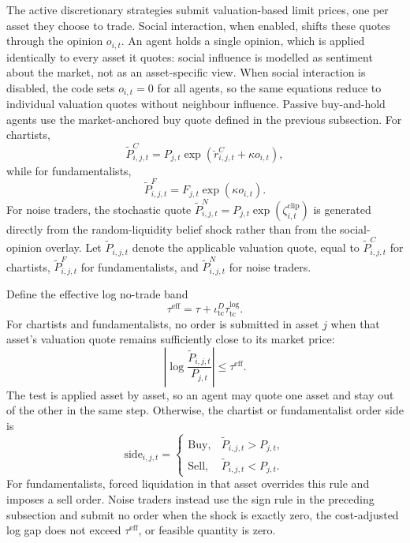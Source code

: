 \documentclass[12pt, a4paper]{article}
\begin{document}
    The active discretionary strategies submit valuation-based limit prices, one
    per asset they choose to trade. Social interaction, when enabled, shifts these
    quotes through the opinion \(o_{i,t}\). An agent holds a single opinion, which
    is applied identically to every asset it quotes: social influence is modelled
    as sentiment about the market, not as an asset-specific view. When social
    interaction is disabled, the code sets \(o_{i,t}=0\) for all agents, so the
    same equations reduce to individual valuation quotes without neighbour
    influence. Passive buy-and-hold agents use the market-anchored buy quote
    defined in the previous subsection. For chartists,
    \begin{equation}
        \tilde P_{i,j,t}^{C}=P_{j,t}\exp\!\left(\breve r_{i,j,t}^{C}+\kappa o_{i,t}\right),
    \end{equation}
    while for fundamentalists,
    \begin{equation}
        \tilde P_{i,j,t}^{F}=F_{j,t}\exp\!\left(\kappa o_{i,t}\right).
    \end{equation}
    For noise traders, the stochastic quote
    \(\tilde P_{i,j,t}^{N}=P_{j,t}\exp(\zeta_{i,t}^{\mathrm{clip}})\) is generated
    directly from the random-liquidity belief shock rather than from the
    social-opinion overlay.
    Let \(\tilde P_{i,j,t}\) denote the applicable valuation quote, equal to
    \(\tilde P_{i,j,t}^{C}\) for chartists, \(\tilde P_{i,j,t}^{F}\) for
    fundamentalists, and \(\tilde P_{i,j,t}^{N}\) for noise traders.

    Define the effective log no-trade band
    \[
        \tau^{\mathrm{eff}}
        =
        \tau+\iota_{\mathrm{tc}}^D\tau_{\mathrm{tc}}^{\log}.
    \]
    For chartists and fundamentalists, no order is submitted in asset \(j\) when
    that asset's valuation quote remains sufficiently close to its market price:
    \begin{equation}
        \left|\log\frac{\tilde P_{i,j,t}}{P_{j,t}}\right|\le \tau^{\mathrm{eff}}.
    \end{equation}
    The test is applied asset by asset, so an agent may quote one asset and stay
    out of the other in the same step. Otherwise, the chartist or fundamentalist
    order side is
    \begin{equation}
        \mathrm{side}_{i,j,t}=
        \begin{cases}
            \mathrm{Buy}, & \tilde P_{i,j,t}>P_{j,t},\\
            \mathrm{Sell}, & \tilde P_{i,j,t}<P_{j,t}.
        \end{cases}
    \end{equation}
    For fundamentalists, forced liquidation in that asset overrides this rule and
    imposes a sell order. Noise traders instead use the sign rule in the preceding
    subsection and submit no order when the shock is exactly zero, the
    cost-adjusted log gap does not exceed \(\tau^{\mathrm{eff}}\), or feasible
    quantity is zero.
\end{document}
